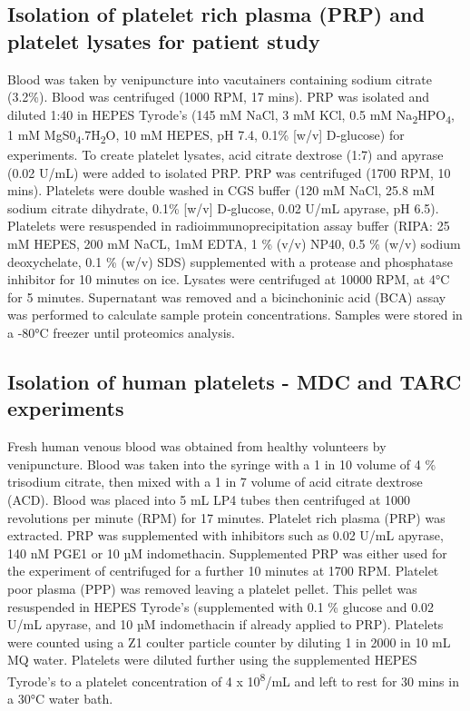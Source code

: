 \documentclass[11pt,twoside]{bristolthesis}
\begin{document}
\hypertarget{isolation-of-platelet-rich-plasma-prp-and-platelet-lysates-for-patient-study}{%
\subsection{Isolation of platelet rich plasma (PRP) and platelet lysates for patient study}\label{isolation-of-platelet-rich-plasma-prp-and-platelet-lysates-for-patient-study}}

Blood was taken by venipuncture into vacutainers containing sodium citrate (3.2\%). Blood was centrifuged (1000 RPM, 17 mins). PRP was isolated and diluted 1:40 in HEPES Tyrode's (145 mM NaCl, 3 mM KCl, 0.5 mM Na\textsubscript{2}HPO\textsubscript{4}, 1 mM MgS0\textsubscript{4}.7H\textsubscript{2}O, 10 mM HEPES, pH 7.4, 0.1\% {[}w/v{]} D‐glucose) for experiments. To create platelet lysates, acid citrate dextrose (1:7) and apyrase (0.02 U/mL) were added to isolated PRP. PRP was centrifuged (1700 RPM, 10 mins). Platelets were double washed in CGS buffer (120 mM NaCl, 25.8 mM sodium citrate dihydrate, 0.1\% {[}w/v{]} D‐glucose, 0.02 U/mL apyrase, pH 6.5). Platelets were resuspended in radioimmunoprecipitation assay buffer (RIPA: 25 mM HEPES, 200 mM NaCL, 1mM EDTA, 1 \% (v/v) NP40, 0.5 \% (w/v) sodium deoxychelate, 0.1 \% (w/v) SDS) supplemented with a protease and phosphatase inhibitor for 10 minutes on ice. Lysates were centrifuged at 10000 RPM, at 4°C for 5 minutes. Supernatant was removed and a bicinchoninic acid (BCA) assay was performed to calculate sample protein concentrations. Samples were stored in a -80°C freezer until proteomics analysis.

\hypertarget{isolation-of-human-platelets---mdc-and-tarc-experiments}{%
\subsection{Isolation of human platelets - MDC and TARC experiments}\label{isolation-of-human-platelets---mdc-and-tarc-experiments}}

Fresh human venous blood was obtained from healthy volunteers by venipuncture. Blood was taken into the syringe with a 1 in 10 volume of 4 \% trisodium citrate, then mixed with a 1 in 7 volume of acid citrate dextrose (ACD). Blood was placed into 5 mL LP4 tubes then centrifuged at 1000 revolutions per minute (RPM) for 17 minutes. Platelet rich plasma (PRP) was extracted. PRP was supplemented with inhibitors such as 0.02 U/mL apyrase, 140 nM PGE1 or 10 µM indomethacin. Supplemented PRP was either used for the experiment of centrifuged for a further 10 minutes at 1700 RPM. Platelet poor plasma (PPP) was removed leaving a platelet pellet. This pellet was resuspended in HEPES Tyrode's (supplemented with 0.1 \% glucose and 0.02 U/mL apyrase, and 10 µM indomethacin if already applied to PRP). Platelets were counted using a Z1 coulter particle counter by diluting 1 in 2000 in 10 mL MQ water. Platelets were diluted further using the supplemented HEPES Tyrode's to a platelet concentration of 4 x 10\textsuperscript{8}/mL and left to rest for 30 mins in a 30°C water bath.
\end{document}
